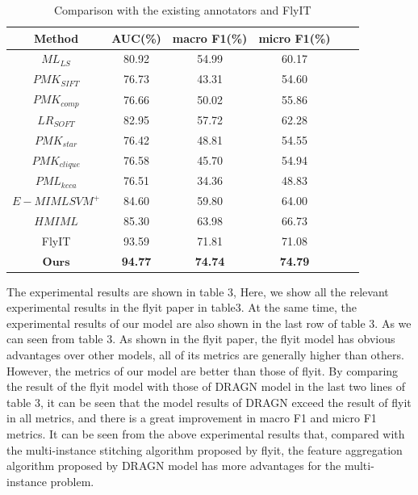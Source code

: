 \documentclass[10pt,twocolumn,letterpaper]{article}
\begin{document}
\begin{table}
\footnotesize
\begin{center}
\begin{tabular}{|c|c|c|c|c|c|}
\hline
Method & AUC(\%) & macro F1(\%)  & micro F1(\%)\\
\hline\hline
$ML_{LS}$ & 80.92 & 54.99 & 60.17 \\
$PMK_{SIFT}$ & 76.73 & 43.31 & 54.60 \\
$PMK_{comp}$ & 76.66 & 50.02 & 55.86 \\
$LR_{SOFT}$ & 82.95 & 57.72 & 62.28 \\
$PMK_{star}$ & 76.42 & 48.81 & 54.55 \\

$PMK_{clique}$ & 76.58 & 45.70 & 54.94 \\
$PML_{kcca}$ & 76.51 & 34.36 & 48.83 \\
$E-MIMLSVM^{+}$ & 84.60 & 59.80 & 64.00 \\
$HMIML$ & 85.30 & 63.98 & 66.73 \\
FlyIT & 93.59 & 71.81 & 71.08 \\ \hline 
$\textbf{Ours}$ & \textbf{94.77} & \textbf{74.74} & \textbf{74.79} \\
\hline
\end{tabular}
\end{center}
\caption{Comparison with the existing annotators and FlyIT}
\end{table}

The experimental results are shown in table 3, Here, we show all the relevant experimental results in the flyit paper in table3. At the same time, the experimental results of our model are also shown in the last row of table 3. As we can seen from table 3. As shown in the flyit paper, the flyit model has obvious advantages over other models, all of its metrics are generally higher than others. However, the metrics of our model are better than those of flyit. By comparing the result of the flyit model with those of DRAGN model in the last two lines of table 3, it can be seen that the model results of DRAGN exceed the result of flyit in all metrics, and there is a great improvement in macro F1 and micro F1 metrics. It can be seen from the above experimental results that, compared with the multi-instance stitching algorithm proposed by flyit, the feature aggregation algorithm proposed by DRAGN model has more advantages for the multi-instance problem.
\end{document}
